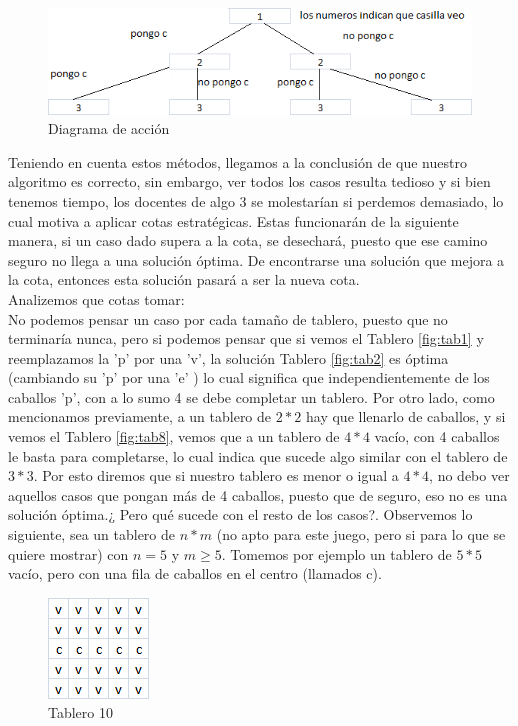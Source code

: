 \begin{figure}[htb]
  \begin{center}
      \includegraphics[scale=1]{imagenes/tab9.png}
  \end{center}
  \caption{Diagrama de acción}\label{fig:diag}
\end{figure}

Teniendo en cuenta estos métodos, llegamos a la conclusión de que nuestro algoritmo es correcto, sin embargo, ver todos los casos resulta tedioso y si bien tenemos tiempo, los docentes de algo 3 se molestarían si perdemos demasiado, lo cual motiva a aplicar cotas estratégicas. Estas funcionarán de la siguiente manera, si un caso dado supera a la cota, se desechará, puesto que ese camino seguro no llega a una solución óptima. De encontrarse una solución que mejora a la cota, entonces esta solución pasará a ser la nueva cota.\\
Analizemos que cotas tomar:\\
No podemos pensar un caso por cada tamaño de tablero, puesto que no terminaría nunca, pero si podemos pensar que si vemos el Tablero \ref{fig:tab1} y reemplazamos la 'p' por una 'v', la solución Tablero \ref{fig:tab2} es óptima (cambiando su 'p' por una 'e' ) lo cual significa que independientemente de los caballos 'p', con a lo sumo 4 se debe completar un tablero. Por otro lado, como mencionamos previamente, a un tablero de $2*2$ hay que llenarlo de caballos, y si vemos el Tablero \ref{fig:tab8}, vemos que a un tablero de $4*4$ vacío, con 4 caballos le basta para completarse, lo cual indica que sucede algo similar con el tablero de $3*3$. Por esto diremos que si nuestro tablero es menor o igual a $4*4$, no debo ver aquellos casos que pongan más de 4 caballos, puesto que de seguro, eso no es una solución óptima.¿ Pero qué sucede con el resto de los casos?. Observemos lo siguiente, sea un tablero de $n*m$ (no apto para este juego, pero si para lo que se quiere mostrar) con  $n=5$ y $m\geq5$. Tomemos por ejemplo un tablero de $5*5$ vacío, pero con una fila de caballos en el centro (llamados c).

\begin{figure}[htb]
  \begin{center}
      \includegraphics[scale=1]{imagenes/tab10.png}
  \end{center}
  \caption{Tablero 10}\label{fig:tab10}
\end{figure}


